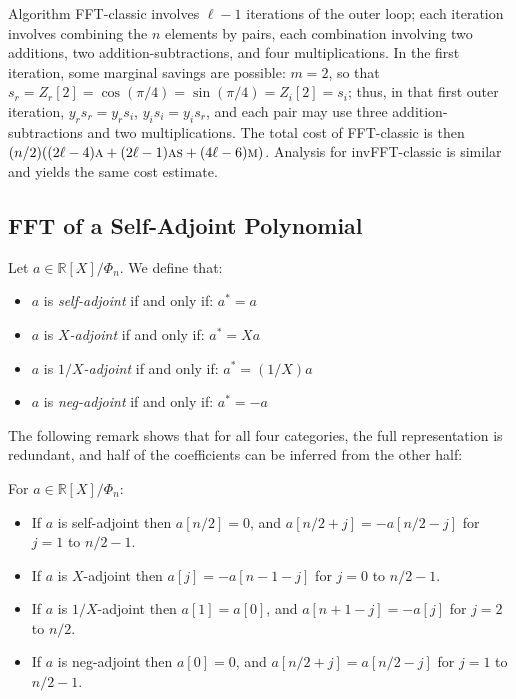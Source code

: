 \documentclass{llncs}
\newcommand{\bR}{\mathbb{R}}
\newcommand{\adj}[1]{{#1}^*}
\begin{document}
Algorithm \textsf{FFT-classic} involves $\ell - 1$ iterations of the
outer loop; each iteration involves combining the $n$ elements by pairs,
each combination involving two additions, two addition-subtractions, and
four multiplications. In the first iteration, some marginal savings are
possible: $m = 2$, so that $s_r = Z_r[2] = \cos(\pi/4) = \sin(\pi/4) =
Z_i[2] = s_i$; thus, in that first outer iteration, $y_r s_r = y_r s_i$,
$y_i s_i = y_i s_r$, and each pair may use three addition-subtractions
and two multiplications. The total cost of \textsf{FFT-classic} is then
$(n/2)((2\ell - 4)\text{\textsc{a}} + (2\ell - 1)\text{\textsc{as}} +
(4\ell - 6)\text{\textsc{m}})$. Analysis for \textsf{invFFT-classic} is
similar and yields the same cost estimate.

\subsection{FFT of a Self-Adjoint Polynomial}

Let $a \in \bR[X]/\Phi_n$. We define that:
\begin{itemize}

    \item $a$ is \emph{self-adjoint} if and only if: $\adj{a} = a$

    \item $a$ is \emph{$X$-adjoint} if and only if: $\adj{a} = X a$

    \item $a$ is \emph{$1/X$-adjoint} if and only if: $\adj{a} = (1/X) a$

    \item $a$ is \emph{neg-adjoint} if and only if: $\adj{a} = -a$

\end{itemize}

The following remark shows that for all four categories, the full
representation is redundant, and half of the coefficients can be inferred
from the other half:
\begin{remark}\label{remark:adjcoeffs}
For $a \in \bR[X]/\Phi_n$:
\begin{itemize}

    \item If $a$ is self-adjoint then $a[n/2] = 0$, and
    $a[n/2 + j] = -a[n/2 - j]$ for $j = 1$ to $n/2 - 1$.

    \item If $a$ is $X$-adjoint then $a[j] = -a[n - 1 - j]$ for
    $j = 0$ to $n/2 - 1$.

    \item If $a$ is $1/X$-adjoint then $a[1] = a[0]$, and
    $a[n + 1 - j] = -a[j]$ for $j = 2$ to $n/2$.

    \item If $a$ is neg-adjoint then $a[0] = 0$, and
    $a[n/2 + j] = a[n/2 - j]$ for $j = 1$ to $n/2 - 1$.

\end{itemize}
\end{remark}
\end{document}
